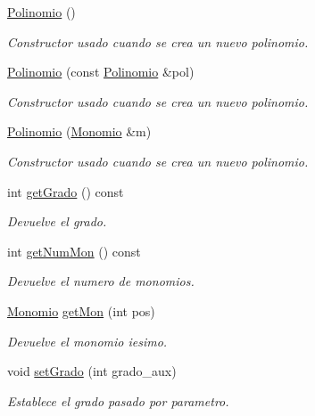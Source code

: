 \begin{DoxyCompactItemize}
\item 
\hyperlink{classed_1_1Polinomio_a508f6cc915640e271ae01480a800c823}{Polinomio} ()
\begin{DoxyCompactList}\small\item\em Constructor usado cuando se crea un nuevo polinomio. \end{DoxyCompactList}\item 
\hyperlink{classed_1_1Polinomio_a1e8581075a14e82121346fb82f192535}{Polinomio} (const \hyperlink{classed_1_1Polinomio}{Polinomio} \&pol)
\begin{DoxyCompactList}\small\item\em Constructor usado cuando se crea un nuevo polinomio. \end{DoxyCompactList}\item 
\hyperlink{classed_1_1Polinomio_a47c35be8ba2d3b17a4c1c238797b6b3d}{Polinomio} (\hyperlink{classed_1_1Monomio}{Monomio} \&m)
\begin{DoxyCompactList}\small\item\em Constructor usado cuando se crea un nuevo polinomio. \end{DoxyCompactList}\item 
int \hyperlink{classed_1_1Polinomio_a6652a2361f03daf45b38a97e8b146d15}{get\+Grado} () const 
\begin{DoxyCompactList}\small\item\em Devuelve el grado. \end{DoxyCompactList}\item 
int \hyperlink{classed_1_1Polinomio_a778988ce7466dde1d73cce206625b43c}{get\+Num\+Mon} () const 
\begin{DoxyCompactList}\small\item\em Devuelve el numero de monomios. \end{DoxyCompactList}\item 
\hyperlink{classed_1_1Monomio}{Monomio} \hyperlink{classed_1_1Polinomio_a5bb00eac1c6105992e4facb276568319}{get\+Mon} (int pos)
\begin{DoxyCompactList}\small\item\em Devuelve el monomio iesimo. \end{DoxyCompactList}\item 
void \hyperlink{classed_1_1Polinomio_a06a1d58a8cd14b9fedf52960e304f636}{set\+Grado} (int grado\+\_\+aux)
\begin{DoxyCompactList}\small\item\em Establece el grado pasado por parametro. \end{DoxyCompactList}\item 

\end{DoxyCompactItemize}

